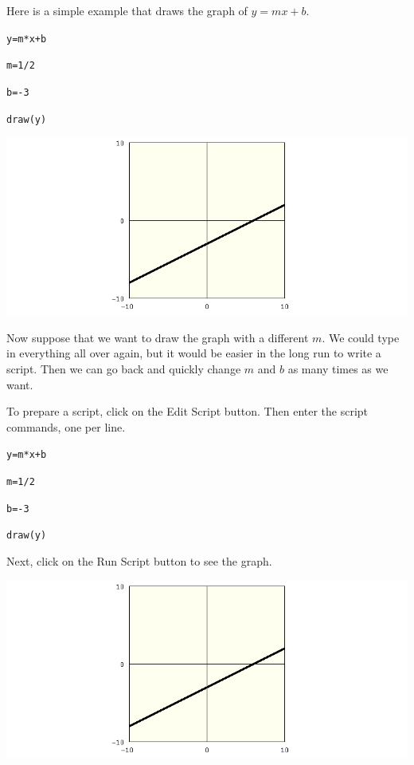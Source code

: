 
\newpage


\noindent
Here is a simple example that draws the graph of $y=mx+b$.

\medskip
{\tt y=m*x+b}

{\tt m=1/2}

{\tt b=-3}

{\tt draw(y)}

\medskip
\noindent
\includegraphics[scale=0.4]{1.png}

\newpage

\noindent
Now suppose that we want to draw the graph
with a different $m$.
We could type in everything all over again, but it would be easier
in the long run to write a script.
Then we can go back and quickly change $m$ and $b$ as many times as we want.

\medskip
\noindent
To prepare a script, click on the Edit Script button.
Then enter the script commands, one per line.

\medskip
{\tt y=m*x+b}

{\tt m=1/2}

{\tt b=-3}

{\tt draw(y)}

\medskip
\noindent
Next, click on the Run Script button to see the graph.

\medskip
\noindent
\includegraphics[scale=0.4]{1.png}

